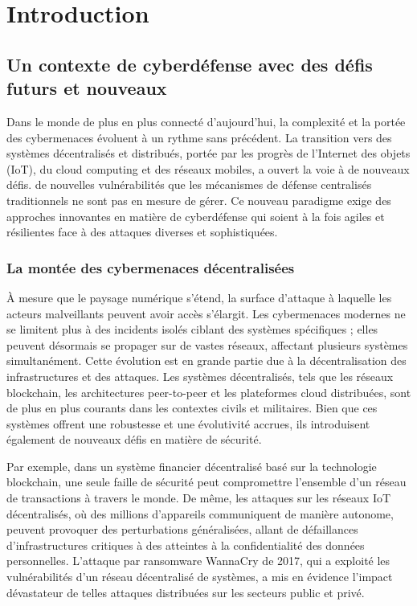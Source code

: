 \chapter{Introduction}\label{ch:introduction}

\section{Un contexte de cyberdéfense avec des défis futurs et nouveaux}

Dans le monde de plus en plus connecté d'aujourd'hui, la complexité et la portée des cybermenaces évoluent à un rythme sans précédent. La transition vers des systèmes décentralisés et distribués, portée par les progrès de l'Internet des objets (IoT), du cloud computing et des réseaux mobiles, a ouvert la voie à de nouveaux défis. de nouvelles vulnérabilités que les mécanismes de défense centralisés traditionnels ne sont pas en mesure de gérer\cite{sun2014data}. Ce nouveau paradigme exige des approches innovantes en matière de cyberdéfense qui soient à la fois agiles et résilientes face à des attaques diverses et sophistiquées\cite{taddeo2019trusting}.

\subsection{La montée des cybermenaces décentralisées}

À mesure que le paysage numérique s’étend, la surface d’attaque à laquelle les acteurs malveillants peuvent avoir accès s’élargit. Les cybermenaces modernes ne se limitent plus à des incidents isolés ciblant des systèmes spécifiques ; elles peuvent désormais se propager sur de vastes réseaux, affectant plusieurs systèmes simultanément. Cette évolution est en grande partie due à la décentralisation des infrastructures et des attaques. Les systèmes décentralisés, tels que les réseaux blockchain, les architectures peer-to-peer et les plateformes cloud distribuées, sont de plus en plus courants dans les contextes civils et militaires. Bien que ces systèmes offrent une robustesse et une évolutivité accrues, ils introduisent également de nouveaux défis en matière de sécurité.

Par exemple, dans un système financier décentralisé basé sur la technologie blockchain, une seule faille de sécurité peut compromettre l’ensemble d’un réseau de transactions à travers le monde\cite{li2020survey}. De même, les attaques sur les réseaux IoT décentralisés, où des millions d’appareils communiquent de manière autonome, peuvent provoquer des perturbations généralisées, allant de défaillances d’infrastructures critiques à des atteintes à la confidentialité des données personnelles\cite{sun2014data}. L’attaque par ransomware WannaCry de 2017, qui a exploité les vulnérabilités d’un réseau décentralisé de systèmes, a mis en évidence l’impact dévastateur de telles attaques distribuées sur les secteurs public et privé\cite{mohurle2017wannacry}.

